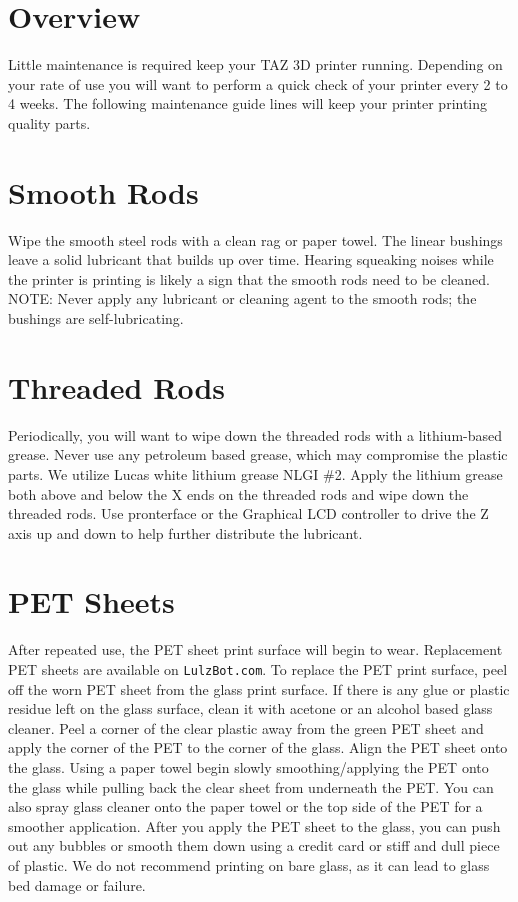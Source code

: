 %
%
%
%
%

\section{Overview}
Little maintenance is required keep your TAZ 3D printer running. Depending on your rate of use you will want to perform a quick check of your printer every 2 to 4 weeks. The following maintenance guide lines will keep your printer printing quality parts.

\section{Smooth Rods}
Wipe the smooth steel rods with a clean rag or paper towel. The linear bushings leave a solid lubricant that builds up over time. Hearing squeaking noises while the printer is printing is likely a sign that the smooth rods need to be cleaned. NOTE: Never apply any lubricant or cleaning agent to the smooth rods; the bushings are self-lubricating.

\section{Threaded Rods}
Periodically, you will want to wipe down the threaded rods with a lithium-based grease. Never use any petroleum based grease, which may compromise the plastic parts. We utilize Lucas white lithium grease NLGI \#2. Apply the lithium grease both above and below the X ends on the threaded rods and wipe down the threaded rods. Use pronterface or the Graphical LCD controller to drive the Z axis up and down to help further distribute the lubricant.

\section{PET Sheets}
After repeated use, the PET sheet print surface will begin to wear. Replacement PET sheets are available on \texttt{LulzBot.com}. To replace the PET print surface, peel off the worn PET sheet from the glass print surface. If there is any glue or plastic residue left on the glass surface, clean it with acetone or an alcohol based glass cleaner. Peel a corner of the clear plastic away from the green PET sheet and apply the corner of the PET to the corner of the glass. Align the PET sheet onto the glass. Using a paper towel begin slowly smoothing/applying the PET onto the glass while pulling back the clear sheet from underneath the PET. You can also spray glass cleaner onto the paper towel or the top side of the PET for a smoother application. After you apply the PET sheet to the glass, you can push out any bubbles or smooth them down using a credit card or stiff and dull piece of plastic. We do not recommend printing on bare glass, as it can lead to glass bed damage or failure.

